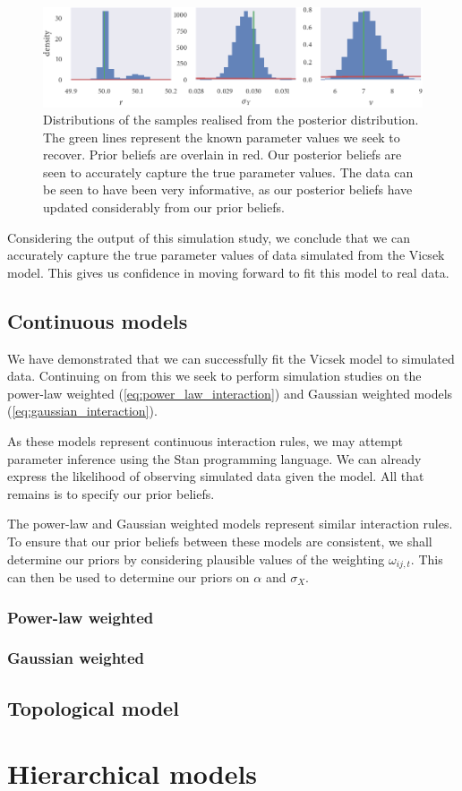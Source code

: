 \begin{figure}[tb]
    \includegraphics{mh_r_hist.pdf}
    \caption{Distributions of the samples realised from the posterior distribution. The
    green lines represent the known parameter values we seek to recover. Prior beliefs are
    overlain in red. Our posterior beliefs are seen to accurately capture the true
    parameter values. The data can be seen to have been very informative, as our posterior
    beliefs have updated considerably from our prior beliefs.}
    \label{fig:vicsek_sim_study_hists}
\end{figure}

Considering the output of this simulation study, we conclude that we can accurately
capture the true parameter values of data simulated from the Vicsek model. This gives us
confidence in moving forward to fit this model to real data.

\subsection{Continuous models}

We have demonstrated that we can successfully fit the Vicsek model to simulated data.
Continuing on from this we seek to perform simulation studies on the power-law weighted
(\cref{eq:power_law_interaction}) and Gaussian weighted models
(\cref{eq:gaussian_interaction}).

As these models represent continuous interaction rules, we may attempt parameter inference
using the Stan programming language. We can already express the likelihood of observing
simulated data given the model. All that remains is to specify our prior beliefs.

The power-law and Gaussian weighted models represent similar interaction rules. To ensure
that our prior beliefs between these models are consistent, we shall determine our priors
by considering plausible values of the weighting $\omega_{ij,t}$. This can then be used to 
determine our priors on $\alpha$ and $\sigma_X$.

\subsubsection{Power-law weighted}

\subsubsection{Gaussian weighted}

\subsection{Topological model}

\section{Hierarchical models}
